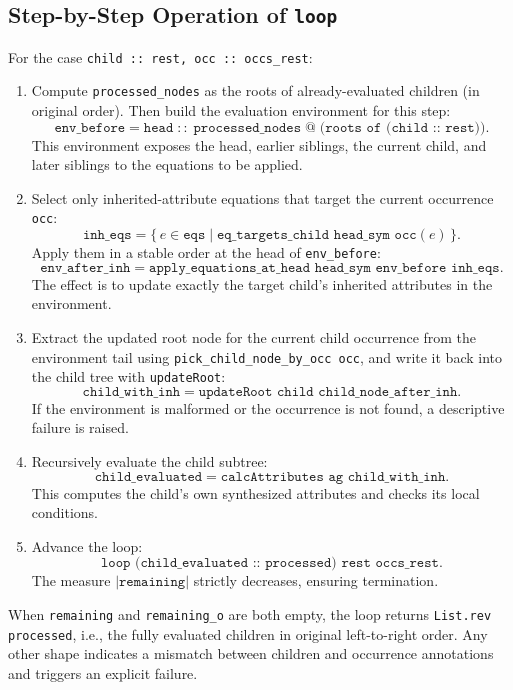 \subsection{Step-by-Step Operation of \texttt{loop}}
For the case \verb|child :: rest, occ :: occs_rest|:
\begin{enumerate}
  \item Compute \texttt{processed\_nodes} as the roots of already-evaluated children (in original order). Then build the evaluation environment for this step:
  \[
    \texttt{env\_before} =
    \texttt{head} \;::\;
    \texttt{processed\_nodes} \; @ \;
    \texttt{(roots of (child :: rest))}.
  \]
  This environment exposes the head, earlier siblings, the current child, and later siblings to the equations to be applied. 

  \item Select only inherited-attribute equations that target the current occurrence \texttt{occ}:
  \[
    \texttt{inh\_eqs} =
    \{\, e \in \texttt{eqs} \mid \texttt{eq\_targets\_child head\_sym occ}(e)\,\}.
  \]
  Apply them in a stable order at the head of \texttt{env\_before}:
  \[
    \texttt{env\_after\_inh} =
    \texttt{apply\_equations\_at\_head head\_sym env\_before inh\_eqs}.
  \]
  The effect is to update exactly the target child’s inherited attributes in the environment. 

  \item Extract the updated root node for the current child occurrence from the environment tail using \texttt{pick\_child\_node\_by\_occ occ}, and write 
  it back into the child tree with \texttt{updateRoot}:
  \[
    \texttt{child\_with\_inh} = \texttt{updateRoot child child\_node\_after\_inh}.
  \]
  If the environment is malformed or the occurrence is not found, a descriptive failure is raised. 

  \item Recursively evaluate the child subtree:
  \[
    \texttt{child\_evaluated} = \texttt{calcAttributes ag child\_with\_inh}.
  \]
  This computes the child's own synthesized attributes and checks its local conditions. 

  \item Advance the loop:
  \[
    \texttt{loop (child\_evaluated :: processed) rest occs\_rest}.
  \]
  The measure \(|\texttt{remaining}|\) strictly decreases, ensuring termination. 
\end{enumerate}

When \texttt{remaining} and \texttt{remaining\_o} are both empty, the loop returns \texttt{List.rev processed}, i.e., the fully evaluated children in original 
left-to-right order. Any other shape indicates a mismatch between children and occurrence annotations and triggers an explicit failure. 

